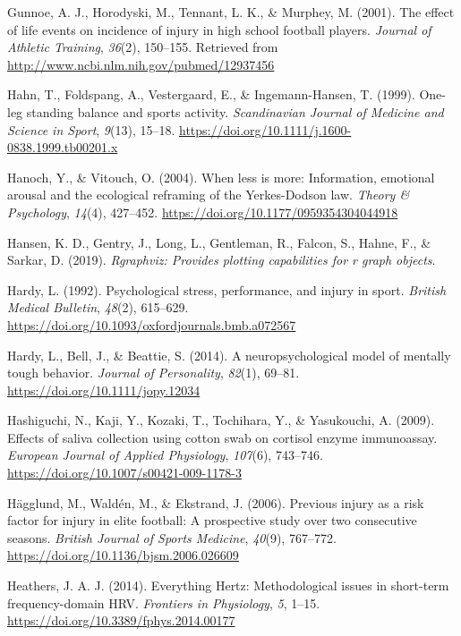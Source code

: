 \documentclass[
  english,
  man,floatsintext]{apa6}
\begin{document}
\leavevmode\hypertarget{ref-Gunnoe2001}{}%
Gunnoe, A. J., Horodyski, M., Tennant, L. K., \& Murphey, M. (2001). The effect of life events on incidence of injury in high school football players. \emph{Journal of Athletic Training}, \emph{36}(2), 150--155. Retrieved from \url{http://www.ncbi.nlm.nih.gov/pubmed/12937456}

\leavevmode\hypertarget{ref-Hahn1999}{}%
Hahn, T., Foldspang, A., Vestergaard, E., \& Ingemann-Hansen, T. (1999). One-leg standing balance and sports activity. \emph{Scandinavian Journal of Medicine and Science in Sport}, \emph{9}(13), 15--18. \url{https://doi.org/10.1111/j.1600-0838.1999.tb00201.x}

\leavevmode\hypertarget{ref-Hanoch2004}{}%
Hanoch, Y., \& Vitouch, O. (2004). When less is more: Information, emotional arousal and the ecological reframing of the Yerkes-Dodson law. \emph{Theory \& Psychology}, \emph{14}(4), 427--452. \url{https://doi.org/10.1177/0959354304044918}

\leavevmode\hypertarget{ref-R-Rgraphviz}{}%
Hansen, K. D., Gentry, J., Long, L., Gentleman, R., Falcon, S., Hahne, F., \& Sarkar, D. (2019). \emph{Rgraphviz: Provides plotting capabilities for r graph objects}.

\leavevmode\hypertarget{ref-Hardy1992}{}%
Hardy, L. (1992). Psychological stress, performance, and injury in sport. \emph{British Medical Bulletin}, \emph{48}(2), 615--629. \url{https://doi.org/10.1093/oxfordjournals.bmb.a072567}

\leavevmode\hypertarget{ref-Hardy2014}{}%
Hardy, L., Bell, J., \& Beattie, S. (2014). A neuropsychological model of mentally tough behavior. \emph{Journal of Personality}, \emph{82}(1), 69--81. \url{https://doi.org/10.1111/jopy.12034}

\leavevmode\hypertarget{ref-Hashiguchi2009}{}%
Hashiguchi, N., Kaji, Y., Kozaki, T., Tochihara, Y., \& Yasukouchi, A. (2009). Effects of saliva collection using cotton swab on cortisol enzyme immunoassay. \emph{European Journal of Applied Physiology}, \emph{107}(6), 743--746. \url{https://doi.org/10.1007/s00421-009-1178-3}

\leavevmode\hypertarget{ref-Hagglund2006}{}%
Hägglund, M., Waldén, M., \& Ekstrand, J. (2006). Previous injury as a risk factor for injury in elite football: A prospective study over two consecutive seasons. \emph{British Journal of Sports Medicine}, \emph{40}(9), 767--772. \url{https://doi.org/10.1136/bjsm.2006.026609}

\leavevmode\hypertarget{ref-Heathers2014}{}%
Heathers, J. A. J. (2014). Everything Hertz: Methodological issues in short-term frequency-domain HRV. \emph{Frontiers in Physiology}, \emph{5}, 1--15. \url{https://doi.org/10.3389/fphys.2014.00177}
\end{document}
